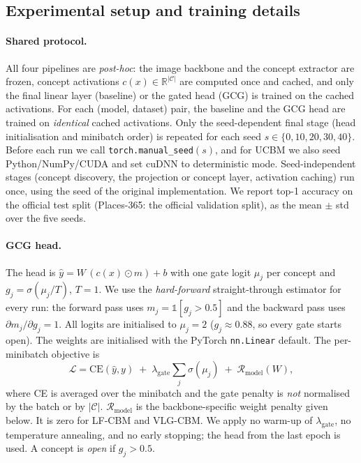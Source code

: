 \providecommand{\chk}[1]{\textcolor{red}{[CHECK: #1]}}

\subsection{Experimental setup and training details}
\label{app:hyperparam}

\paragraph{Shared protocol.}
All four pipelines are \emph{post-hoc}: the image backbone and the concept extractor are
frozen, concept activations $c(x)\in\mathbb{R}^{|\mathcal{C}|}$ are computed once and cached,
and only the final linear layer (baseline) or the gated head (GCG) is trained on the cached
activations. For each (model, dataset) pair, the baseline and the GCG head are trained on
\emph{identical} cached activations. Only the seed-dependent final stage (head initialisation
and minibatch order) is repeated for each seed $s\in\{0,10,20,30,40\}$. Before each run we
call \texttt{torch.manual\_seed}$(s)$, and for UCBM we also seed Python/NumPy/CUDA and set
cuDNN to deterministic mode. Seed-independent stages (concept discovery, the projection or
concept layer, activation caching) run once, using the seed of the original implementation.
We report top-1 accuracy on the official test split (Places-365: the official validation
split), as the mean $\pm$ std over the five seeds.

\paragraph{GCG head.}
The head is $\hat y = W\,(c(x)\odot m) + b$ with one gate logit $\mu_j$ per concept and
$g_j=\sigma(\mu_j/T)$, $T=1$. We use the \emph{hard-forward} straight-through estimator for
every run: the forward pass uses $m_j=\mathbb{1}[g_j>0.5]$ and the backward pass uses
$\partial m_j/\partial g_j=1$. All logits are initialised to $\mu_j=2$ ($g_j\approx0.88$, so
every gate starts open). The weights are initialised with the PyTorch \texttt{nn.Linear}
default. The per-minibatch objective is
\[
\mathcal{L} = \mathrm{CE}(\hat y, y) \;+\; \lambda_{\text{gate}}\sum_{j}\sigma(\mu_j)
\;+\; \mathcal{R}_{\text{model}}(W),
\]
where CE is averaged over the minibatch and the gate penalty is \emph{not} normalised by the
batch or by $|\mathcal{C}|$. $\mathcal{R}_{\text{model}}$ is the backbone-specific weight
penalty given below. It is zero for LF-CBM and VLG-CBM. We apply no warm-up of
$\lambda_{\text{gate}}$, no temperature annealing, and no early stopping; the head from the
last epoch is used. A concept is \emph{open} if $g_j>0.5$.

